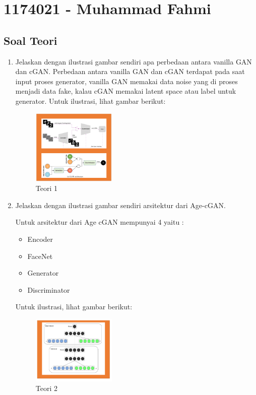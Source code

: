 \section{1174021 - Muhammad Fahmi}
\subsection{Soal Teori}
\begin{enumerate}

	\item Jelaskan dengan ilustrasi gambar sendiri apa perbedaan antara vanilla GAN dan cGAN.
	\hfill\break
	Perbedaan antara vanilla GAN dan cGAN terdapat pada saat input proses generator, vanilla GAN memakai data noise yang di proses menjadi data fake, kalau cGAN memakai latent space atau label untuk generator. Untuk ilustrasi, lihat gambar berikut: 

	\begin{figure}[H]
	\centering
		\includegraphics[width=4cm]{figures/1174021/tugas9/materi/teori1.PNG}
		\caption{Teori 1 }
	\end{figure}

	\item Jelaskan dengan ilustrasi gambar sendiri arsitektur dari Age-cGAN.

	\hfill\break
	Untuk arsitektur dari Age cGAN mempunyai 4 yaitu :
	\begin{itemize}
		\item Encoder
		\item FaceNet
		\item Generator
		\item Discriminator
	\end{itemize}
	Untuk ilustrasi, lihat gambar berikut: 

	\begin{figure}[H]
	\centering
		\includegraphics[width=4cm]{figures/1174021/tugas9/materi/teori2.PNG}
		\caption{Teori 2}
	\end{figure}
	

\end{enumerate}
